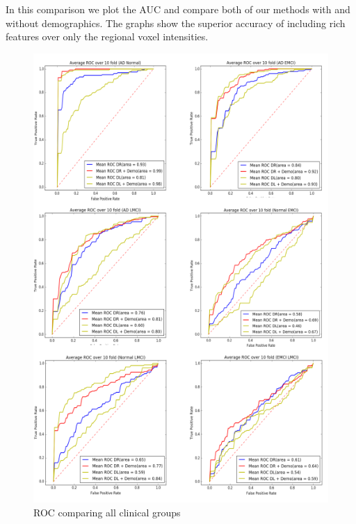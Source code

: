 \documentclass[authoryear,preprint,revi	ew,12pt]{elsarticle}
\begin{document}
In this comparison we plot the AUC and compare both of our methods with and without demographics. The graphs show the superior accuracy of including rich features over only the regional voxel intensities. 
\clearpage
\begin{figure}
	\centering
	\includegraphics[width=0.9\linewidth]{figures/auc.png}
	\caption{ROC comparing all clinical groups}
	\label{fig:auc}
\end{figure}
\end{document}
